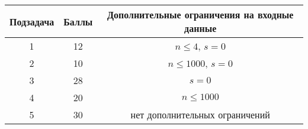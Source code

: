 \begin{center}
\renewcommand{\arraystretch}{1.5}
\begin{tabular}{|c|c|c|}
\hline
Подзадача & Баллы & Дополнительные ограничения на входные данные \\
\hline
1 &  12 & $n \le 4$, $s = 0$ \\
\hline
2 & 10 &  $n \le 1000$, $s = 0$ \\
\hline
3 & 28 & $s = 0$ \\
\hline
4 & 20 & $n \le 1000$ \\
\hline
5 & 30 & нет дополнительных ограничений \\
\hline
\end{tabular}
\end{center}